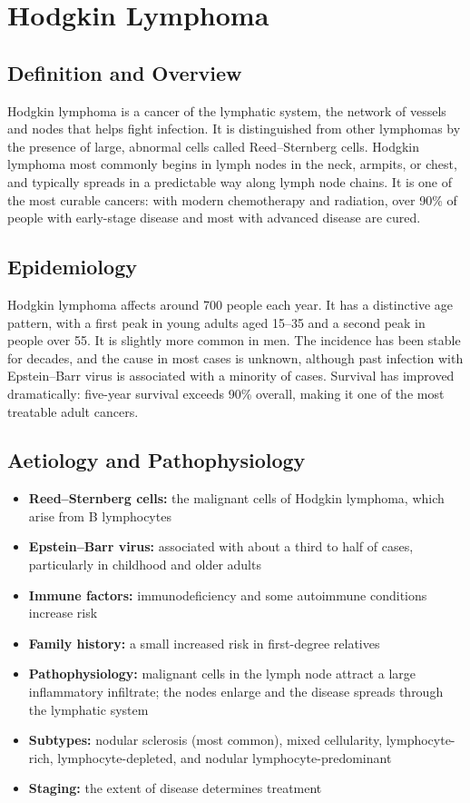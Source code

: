 \chapter{Hodgkin Lymphoma}

\section*{Definition and Overview}
Hodgkin lymphoma is a cancer of the lymphatic system, the network of vessels and nodes that helps fight infection. It is distinguished from other lymphomas by the presence of large, abnormal cells called Reed--Sternberg cells. Hodgkin lymphoma most commonly begins in lymph nodes in the neck, armpits, or chest, and typically spreads in a predictable way along lymph node chains. It is one of the most curable cancers: with modern chemotherapy and radiation, over 90\% of people with early-stage disease and most with advanced disease are cured.

\section*{Epidemiology}
Hodgkin lymphoma affects around 700 people each year. It has a distinctive age pattern, with a first peak in young adults aged 15--35 and a second peak in people over 55. It is slightly more common in men. The incidence has been stable for decades, and the cause in most cases is unknown, although past infection with Epstein--Barr virus is associated with a minority of cases. Survival has improved dramatically: five-year survival exceeds 90\% overall, making it one of the most treatable adult cancers.

\section*{Aetiology and Pathophysiology}
\begin{itemize}
    \item \textbf{Reed--Sternberg cells:} the malignant cells of Hodgkin lymphoma, which arise from B lymphocytes
    \item \textbf{Epstein--Barr virus:} associated with about a third to half of cases, particularly in childhood and older adults
    \item \textbf{Immune factors:} immunodeficiency and some autoimmune conditions increase risk
    \item \textbf{Family history:} a small increased risk in first-degree relatives
    \item \textbf{Pathophysiology:} malignant cells in the lymph node attract a large inflammatory infiltrate; the nodes enlarge and the disease spreads through the lymphatic system
    \item \textbf{Subtypes:} nodular sclerosis (most common), mixed cellularity, lymphocyte-rich, lymphocyte-depleted, and nodular lymphocyte-predominant
    \item \textbf{Staging:} the extent of disease determines treatment
\end{itemize}

